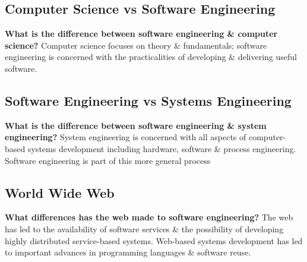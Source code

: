 \documentclass{report}
\begin{document}
\subsection{Computer Science vs Software Engineering}
\noindent\textbf{What is the difference between software engineering \& computer science?}\newline
Computer science focuses on theory \& fundamentals; software engineering is concerned with the practicalities of developing \& delivering useful software.

\subsection{Software Engineering vs Systems Engineering}
\noindent\textbf{What is the difference between software engineering \& system engineering?}\newline
System engineering is concerned with all aspects of computer-based systems development including hardware, software \& process engineering. Software engineering is part of this more general process

\subsection{World Wide Web}
\noindent\textbf{What differences has the web made to software engineering?}\newline
The web has led to the availability of software services \& the possibility of developing highly distributed service-based systems. Web-based systems development has led to important advances in programming languages \& software reuse.

\newpage
\end{document}
